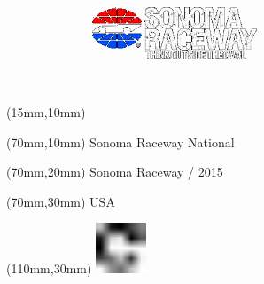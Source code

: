 \null\newpage
\begin{textblock*}{50mm}(15mm,10mm)%
\includegraphics[width=50mm]{LG/SON.png}
\end{textblock*}
\begin{textblock*}{130mm}(70mm,10mm)%
{\fontsize{20}{20}\selectfont Sonoma Raceway National}\\
\end{textblock*}
\begin{textblock*}{120mm}(70mm,20mm)%
{\fontsize{16}{16}\selectfont Sonoma Raceway / 2015}\\
\end{textblock*}
\begin{textblock*}{120mm}(70mm,30mm)%
{\fontsize{12}{12}\selectfont USA}
\end{textblock*}
\begin{textblock*}{30mm}(110mm,30mm)%
\centering
\includegraphics[height=15mm]{icons/fa-rotate-right.pdf}
\end{textblock*}
